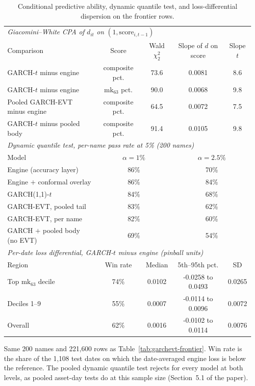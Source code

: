 \documentclass[11pt]{article}
\begin{document}
\begin{table}[htbp]
\centering
\begin{threeparttable}
\caption{Conditional predictive ability, dynamic quantile test, and loss-differential dispersion on the frontier rows.}
\label{tab:extras}
\small
\begin{tabular}{lcccc}
\toprule
\multicolumn{5}{l}{\emph{Giacomini--White CPA of $d_{it}$ on $(1,\mathrm{score}_{i,t-1})$}} \\
Comparison & Score & Wald $\chi^2_2$ & Slope of $d$ on score & Slope $t$ \\
\midrule
GARCH-$t$ minus engine & composite pct. & 73.6 & 0.0081 & 8.6 \\
GARCH-$t$ minus engine & $\mathrm{mk}_{63}$ pct. & 90.0 & 0.0068 & 9.8 \\
Pooled GARCH-EVT minus engine & composite pct. & 64.5 & 0.0072 & 7.5 \\
GARCH-$t$ minus pooled body & composite pct. & 91.4 & 0.0105 & 9.8 \\
\midrule
\multicolumn{5}{l}{\emph{Dynamic quantile test, per-name pass rate at 5\% (200 names)}} \\
Model & \multicolumn{2}{c}{$\alpha=1\%$} & \multicolumn{2}{c}{$\alpha=2.5\%$} \\
\midrule
Engine (accuracy layer) & \multicolumn{2}{c}{86\%} & \multicolumn{2}{c}{70\%} \\
Engine $+$ conformal overlay & \multicolumn{2}{c}{86\%} & \multicolumn{2}{c}{84\%} \\
GARCH(1,1)-$t$ & \multicolumn{2}{c}{84\%} & \multicolumn{2}{c}{68\%} \\
GARCH-EVT, pooled tail & \multicolumn{2}{c}{83\%} & \multicolumn{2}{c}{62\%} \\
GARCH-EVT, per name & \multicolumn{2}{c}{82\%} & \multicolumn{2}{c}{60\%} \\
GARCH $+$ pooled body (no EVT) & \multicolumn{2}{c}{69\%} & \multicolumn{2}{c}{54\%} \\
\midrule
\multicolumn{5}{l}{\emph{Per-date loss differential, GARCH-$t$ minus engine (pinball units)}} \\
Region & Win rate & Median & 5th--95th pct. & SD \\
\midrule
Top $\mathrm{mk}_{63}$ decile & 74\% & 0.0102 & -0.0258 to 0.0493 & 0.0265 \\
Deciles 1--9 & 55\% & 0.0007 & -0.0114 to 0.0096 & 0.0072 \\
Overall & 62\% & 0.0016 & -0.0102 to 0.0114 & 0.0076 \\
\bottomrule
\end{tabular}
\begin{tablenotes}\footnotesize
\item Same 200 names and 221,600 rows as Table~\ref{tab:garchevt-frontier}. Win rate is the share of the 1,108 test dates on which the date-averaged engine loss is below the reference. The pooled dynamic quantile test rejects for every model at both levels, as pooled asset-day tests do at this sample size (Section~5.1 of the paper).
\end{tablenotes}
\end{threeparttable}
\end{table}
\end{document}
